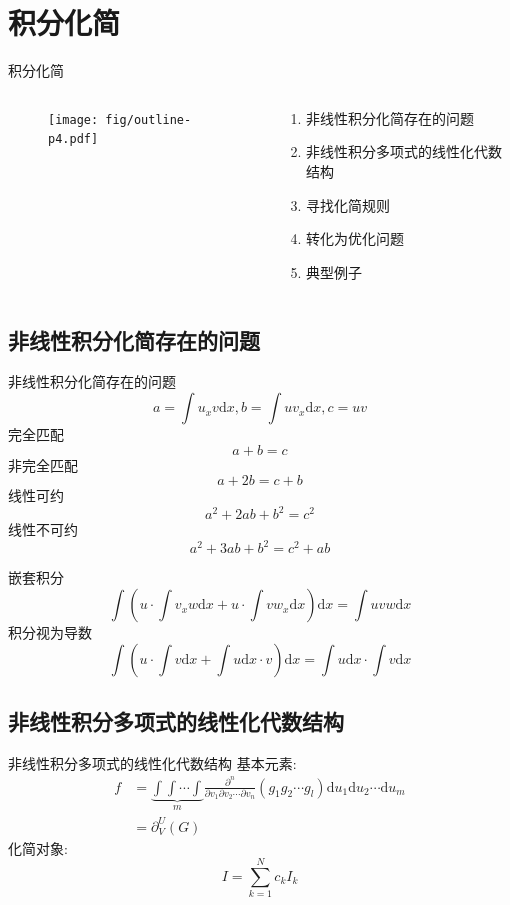 \documentclass{beamer}
\newcommand{\dd}[1]{\mathrm{d}#1}
\begin{document}
\section{积分化简}
\begin{frame}{积分化简}
\begin{columns}
\begin{column}{0.4\textwidth}
  \begin{figure}
    \centering
    \texttt{[image: fig/outline-p4.pdf]}
  \end{figure}
\end{column}
\begin{column}{0.6\textwidth}
  \begin{enumerate}
  \item 非线性积分化简存在的问题
  \item 非线性积分多项式的线性化代数结构 
  \item 寻找化简规则 
  \item 转化为优化问题
  \item 典型例子 
  \end{enumerate}
\end{column}
\end{columns}
\end{frame}

\subsection{非线性积分化简存在的问题}
\begin{frame}{非线性积分化简存在的问题}
\[
    a=\int{u_x v \dd x},b=\int{u v_x \dd x},c=uv
\]
完全匹配
\[
    a+b=c
\]
非完全匹配
\[
    a+2b=c+b
\]
线性可约
\[
    a^2+2ab+b^2=c^2
\]
线性不可约
\[
    a^2+3ab+b^2=c^2+ab
\]
\end{frame}

\begin{frame}
嵌套积分
\[
    \int\!{\left(u\cdot\int\!{v_xw\dd x}+u\cdot\int\!{vw_x\dd x}\right)\dd x}=\int\!{uvw\dd x}
\]
积分视为导数
\[
    \int\!{\left(u\cdot\int\!{v\dd x}+\int\!{u\dd x}\cdot v\right)\dd x}=\int\!{u\dd x}\cdot\int\!{v\dd x}
\]
\end{frame}

\subsection{非线性积分多项式的线性化代数结构}
\begin{frame}{非线性积分多项式的线性化代数结构}
基本元素:
\[
\begin{aligned}
    f&=\underbrace{\int\!\int\!\cdots\!\int}_m{ \frac{\partial^n}{\partial v_1 \partial v_2 \cdots \partial v_n} (g_1 g_2 \cdots g_l)\dd u_1 \dd u_2 \cdots \dd u_m} \\ 
    &=\partial^U_V(G)
\end{aligned}
\]
化简对象:
\[
    I = \sum_{k=1}^N{c_k I_k}
\]
\end{frame}
\end{document}

